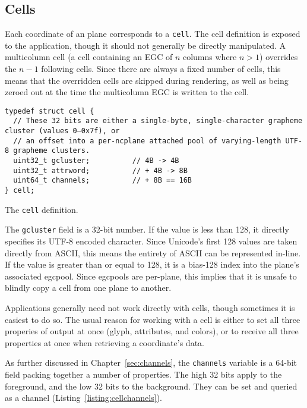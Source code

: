 \subsection{Cells}
\label{sec:cells}
Each coordinate of an plane corresponds to a \texttt{cell}. The cell definition
is exposed to the application, though it should not generally be directly
manipulated. A multicolumn cell (a cell containing an EGC of $n$ columns where
$n>1$) overrides the $n-1$ following cells. Since there are always a fixed
number of cells, this means that the overridden cells are skipped during
rendering, as well as being zeroed out at the time the multicolumn EGC is
written to the cell.
\begin{listing}[!htb]
\begin{verbatim}
typedef struct cell {
  // These 32 bits are either a single-byte, single-character grapheme cluster (values 0–0x7f), or
  // an offset into a per-ncplane attached pool of varying-length UTF-8 grapheme clusters.
  uint32_t gcluster;          // 4B -> 4B
  uint32_t attrword;          // + 4B -> 8B
  uint64_t channels;          // + 8B == 16B
} cell;
\end{verbatim}
\caption{The \texttt{cell} definition.}
\end{listing}
The \texttt{gcluster} field is a 32-bit number. If the value is less than 128,
it directly specifies its UTF-8 encoded character. Since Unicode's first 128
values are taken directly from ASCII, this means the entirety of ASCII can be
represented in-line. If the value is greater than or equal to 128, it is a
bias-128 index into the plane's associated egcpool. Since egcpools are per-plane,
this implies that it is unsafe to blindly copy a cell from one plane to another.

Applications generally need not work directly with cells, though sometimes it
is easiest to do so. The usual reason for working with a cell is either to set
all three properies of output at once (glyph, attributes, and colors), or to
receive all three properties at once when retrieving a coordinate's data.

As further discussed in Chapter~\ref{sec:channels}, the \texttt{channels}
variable is a 64-bit field packing together a number of properties. The high
32 bits apply to the foreground, and the low 32 bits to the background. They
can be set and queried as a channel (Listing~\ref{listing:cellchannels}).


